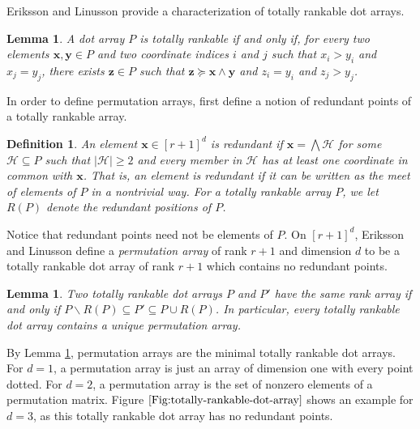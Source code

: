 \documentclass{amsart}
\newtheorem{lemma}[theorem]{Lemma}
\newtheorem{definition}[theorem]{Definition}
\begin{document}
	Eriksson and Linusson provide a characterization of totally rankable dot arrays.
	
	\begin{lemma}\cite[Theorem~3.2]{eriksson2000combinatorial}
		\label{Lem:Totally-Rankable-Characterization}
		A dot array $P$ is totally rankable if and only if, for every two elements $\mathbf{x}, \mathbf{y} \in P$ and two coordinate indices $i$ and $j$ such that $x_i > y_i$ and $x_j = y_j$, there exists $\mathbf{z} \in P$ such that $\mathbf{z} \succeq \mathbf{x} \wedge \mathbf{y}$ and $z_i = y_i$ and $z_j > y_j$.
	\end{lemma}
	
	In order to define permutation arrays, \cite{eriksson2000combinatorial} first define a notion of redundant points of a totally rankable array.
	
	\begin{definition}
		An element $\mathbf{x} \in [r+1]^d$ is redundant if $\mathbf{x} = \bigwedge \mathcal{H}$ for some $\mathcal{H} \subseteq P$ such that $|\mathcal{H}| \geq 2$ and every member in $\mathcal{H}$ has at least one coordinate in common with $\mathbf{x}$. That is, an element is redundant if it can be written as the meet of elements of $P$ in a nontrivial way. For a totally rankable array $P$, we let $R(P)$ denote the redundant positions of $P$.
	\end{definition}
	
	Notice that redundant points need not be elements of $P$. On $[r+1]^d$, Eriksson and Linusson define a \textit{permutation array} of rank $r+1$ and dimension $d$ to be a totally rankable dot array of rank $r+1$ which contains no redundant points.
	
	\begin{lemma}\cite[Proposition~4.1]{eriksson2000combinatorial}
		\label{Lem:Totally-Rankable-Arrays-Have-A-Permutation-Array}
		Two totally rankable dot arrays $P$ and $P'$ have the same rank array if and only if $P \backslash R(P) \subseteq P' \subseteq P \cup R(P)$. In particular, every totally rankable dot array contains a unique permutation array.
	\end{lemma}
	
	By Lemma \ref{Lem:Totally-Rankable-Arrays-Have-A-Permutation-Array}, permutation arrays are the minimal totally rankable dot arrays. For $d=1$, a permutation array is just an array of dimension one with every point dotted. For $d=2$, a permutation array is the set of nonzero elements of a permutation matrix. Figure $\ref{Fig:totally-rankable-dot-array}$ shows an example for $d=3$, as this totally rankable dot array has no redundant points. 
	
\end{document}
